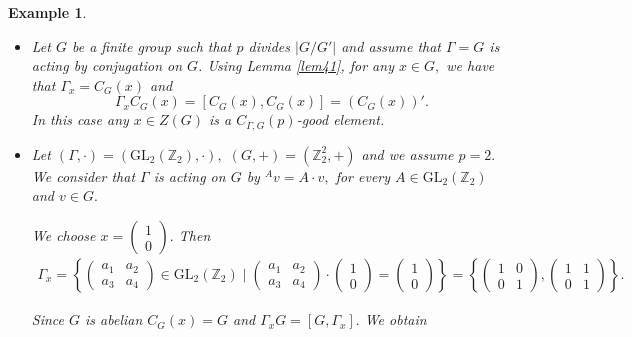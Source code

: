 \documentclass[pdflatex,sn-mathphys-num]{sn-jnl}
\numberwithin{equation}{section}
\theoremstyle{thmstyleone}
\theoremstyle{thmstyletwo}
\newtheorem{example}{Example}
\theoremstyle{thmstylethree}
\begin{document}
\begin{example}\label{ex1}\quad

\begin{itemize}

\item[1)] Let $G$ be a finite group such that  $p$ divides $|G/G'|$ and assume that $\Gamma=G$ is acting by conjugation on $G$. Using Lemma \ref{lem41}, for any  $x\in G,$ we have that $\Gamma_x=C_G(x)$ and   $$\Gamma_xC_G(x)=[C_G(x),C_G(x)]=(C_G(x))'.$$ In this case any $x\in Z(G)$ is a $C_{\Gamma,G}(p)$-good element.


\item[2)] Let $(\Gamma,\cdot)=(\mathrm{GL}_2(\mathbb{Z}_2),\cdot),$  $(G,+)=(\mathbb{Z}_2^2,+)$ and we assume $p=2.$ We consider that $\Gamma$ is acting on $G$ by $^Av=A\cdot v,$ for every $A\in \mathrm{GL}_2(\mathbb{Z}_2)$ and $v\in G.$

We choose $x=\begin{pmatrix}1 \\ 0\end{pmatrix}.$ Then
\begin{align*}
\Gamma_x=\left\{\begin{pmatrix}a_1 & a_2\\a_3 & a_4\end{pmatrix}\in \mathrm{GL}_2(\mathbb{Z}_2)\mid \begin{pmatrix}a_1 & a_2\\a_3 & a_4\end{pmatrix}\cdot\begin{pmatrix}1 \\ 0\end{pmatrix}=\begin{pmatrix}1 \\ 0\end{pmatrix}\right\}=\left\{\begin{pmatrix}1 & 0\\0 & 1\end{pmatrix},\begin{pmatrix} 1& 1\\0 & 1\end{pmatrix}\right\}.
\end{align*}

Since $G$ is abelian $C_G(x)=G$ and $\Gamma_x G=[G,\Gamma_x].$   We obtain


\end{itemize}
\end{example}
\end{document}

